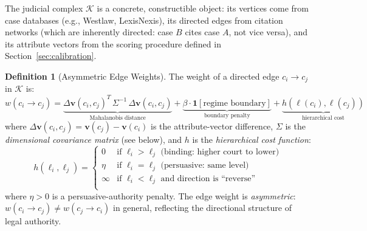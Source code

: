 \documentclass[12pt]{article}
\theoremstyle{definition}
\newtheorem{definition}[theorem]{Definition}
\theoremstyle{remark}
\begin{document}
The judicial complex $\mathcal{K}$ is a concrete, constructible object: its vertices come from case databases (e.g., Westlaw, LexisNexis), its directed edges from citation networks (which are inherently directed: case $B$ cites case $A$, not vice versa), and its attribute vectors from the scoring procedure defined in Section~\ref{sec:calibration}.

\begin{definition}[Asymmetric Edge Weights]
\label{def:edge_weights}
The weight of a directed edge $c_i \to c_j$ in $\mathcal{K}$ is:
\begin{equation}
w(c_i \to c_j) = \underbrace{\Delta \mathbf{v}(c_i, c_j)^T\, \Sigma^{-1}\, \Delta \mathbf{v}(c_i, c_j)}_{\text{Mahalanobis distance}} + \underbrace{\beta \cdot \mathbf{1}[\text{regime boundary}]}_{\text{boundary penalty}} + \underbrace{h(\ell(c_i), \ell(c_j))}_{\text{hierarchical cost}}
\label{eq:edge_weight}
\end{equation}
where $\Delta \mathbf{v}(c_i, c_j) = \mathbf{v}(c_j) - \mathbf{v}(c_i)$ is the attribute-vector difference, $\Sigma$ is the \emph{dimensional covariance matrix} (see below), and $h$ is the \emph{hierarchical cost function}:
\begin{equation}
h(\ell_i, \ell_j) = \begin{cases}
0 & \text{if } \ell_i > \ell_j \text{ (binding: higher court to lower)} \\
\eta & \text{if } \ell_i = \ell_j \text{ (persuasive: same level)} \\
\infty & \text{if } \ell_i < \ell_j \text{ and direction is ``reverse''} \\
\end{cases}
\label{eq:hierarchical_cost}
\end{equation}
where $\eta > 0$ is a persuasive-authority penalty.  The edge weight is \emph{asymmetric}: $w(c_i \to c_j) \neq w(c_j \to c_i)$ in general, reflecting the directional structure of legal authority.
\end{definition}
\end{document}
